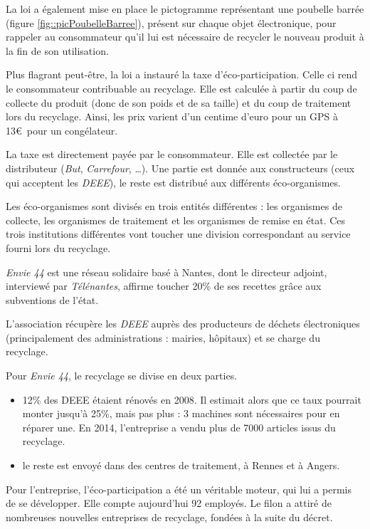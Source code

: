 La loi a également mise en place le pictogramme représentant une poubelle barrée (figure \ref{fig::picPoubelleBarree}), présent sur chaque objet électronique, pour rappeler au consommateur qu'il lui est nécessaire de recycler le nouveau produit à la fin de son utilisation.

Plus flagrant peut-être, la loi a instauré la taxe d'éco-participation. Celle ci rend le consommateur contribuable au recyclage. Elle est calculée à partir du coup de collecte du produit (donc de son poids et de sa taille) et du coup de traitement lors du recyclage. Ainsi, les prix varient d'un centime d'euro pour un GPS à 13\euro~pour un congélateur. 

La taxe est directement payée par le consommateur. Elle est collectée par le distributeur (\textit{But}, \textit{Carrefour}, \dots). Une partie est donnée aux constructeurs (ceux qui acceptent les \textit{DEEE}), le reste est distribué aux différents éco-organismes. 

Les éco-organismes sont divisés en trois entités différentes : les organismes de collecte, les organismes de traitement et les organismes de remise en état. Ces trois institutions différentes vont toucher une division correspondant au service fourni lors du recyclage. 

\medbreak

\textit{Envie 44}  est une réseau solidaire basé à Nantes, dont le directeur adjoint, interviewé par \textit{Télénantes}, affirme toucher 20\% de ses recettes grâce aux subventions de l'état\cite{7andco}.

L'association récupère les \textit{DEEE} auprès des producteurs de déchets électroniques (principa\-lement des administrations : mairies, hôpitaux) et se charge du recyclage. 


Pour \textit{Envie 44}, le recyclage se divise en deux parties. 
\begin{itemize}
\item 12\% des DEEE étaient rénovés en 2008. Il estimait alors que ce taux pourrait monter jusqu'à 25\%, mais pas plus : 3 machines sont nécessaires pour en réparer une. En 2014, l'entreprise a vendu plus de 7000 articles issus du recyclage. 
\item le reste est envoyé dans des centres de traitement, à Rennes et à Angers.
\end{itemize}

Pour l'entreprise, l'éco-participation a été un véritable moteur, qui lui a permis de se développer. Elle compte aujourd'hui 92 employés. Le filon a attiré de nombreuses nouvelles entreprises de recyclage, fondées à la suite du décret. 


